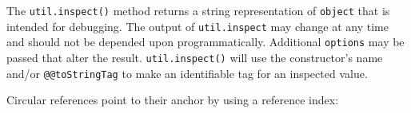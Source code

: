 The \texttt{util.inspect()} method returns a string representation of
\texttt{object} that is intended for debugging. The output of
\texttt{util.inspect} may change at any time and should not be depended
upon programmatically. Additional \texttt{options} may be passed that
alter the result. \texttt{util.inspect()} will use the constructor's
name and/or \texttt{@@toStringTag} to make an identifiable tag for an
inspected value.

\begin{Shaded}
\begin{Highlighting}[]
  \NormalTok{ [}\NormalTok{]() \{}
     \OperatorTok{;}
\NormalTok{  \}}
\NormalTok{\}}


\OperatorTok{=} \NormalTok{(}\OperatorTok{,}\NormalTok{ \{ [}\NormalTok{]}\OperatorTok{:}\NormalTok{ \{ }\OperatorTok{:} \NormalTok{ \} \})}\OperatorTok{;}

\NormalTok{(} \NormalTok{())}\OperatorTok{;} 
\NormalTok{(} \NormalTok{())}\OperatorTok{;} 
\OperatorTok{;}       \CommentTok{// \textquotesingle{}[foo] \{\}\textquotesingle{}}
\end{Highlighting}
\end{Shaded}

Circular references point to their anchor by using a reference index:

